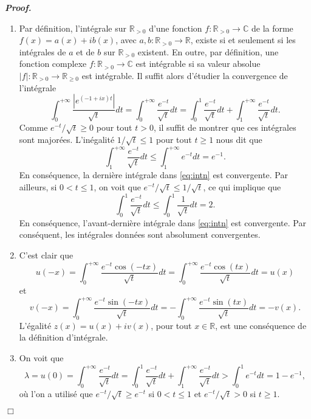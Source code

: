 \documentclass[11pt,a4paper]{article}
\newcommand{\RR}{\mathbb{R}}
\newenvironment{preuve}[1][]
{\vskip 2mm  \noindent\emph{\bf Proof#1. }}{$\Box$ \vskip 2mm}
\let\geq\geqslant
\let\leq\leqslant
\newcommand{\C}{\mathbb{C}}
\begin{document}
	\begin{preuve}
		\begin{enumerate}
			\item Par définition, l'intégrale sur $\RR_{>0}$ d'une fonction $f : \RR_{>0} \rightarrow \C$ de la forme $f(x) = a(x) + i b(x)$, avec $a,b : \RR_{>0} \rightarrow \RR$, existe si et seulement si les intégrales de $a$ et de $b$ sur $\RR_{>0}$ existent. 
			En outre, par définition, une fonction complexe $f : \RR_{>0} \rightarrow \C$ est intégrable si sa valeur absolue 
			$|f| : \RR_{>0} \rightarrow \RR_{\geq 0}$ est intégrable. 
			Il suffit alors d'étudier la convergence de l'intégrale 
			\begin{equation}
			\label{eq:intn}
			\int_0^{+\infty} \frac{|e^{(-1+ix)t}|}{\sqrt{t}} dt = \int_0^{+\infty} \frac{e^{-t}}{\sqrt{t}} dt = \int_0^{1} \frac{e^{-t}}{\sqrt{t}} dt + \int_1^{+\infty} \frac{e^{-t}}{\sqrt{t}} dt.
			\end{equation}
			Comme $e^{-t}/\sqrt{t} \geq 0$ pour tout $t >0$, il suffit de montrer que ces intégrales sont majorées. 
			L'inégalité $1/\sqrt{t} \leq 1$ pour tout $t \geq 1$ nous dit que 
			\[     \int_1^{+\infty} \frac{e^{-t}}{\sqrt{t}} dt \leq \int_1^{+\infty} e^{-t} dt = e^{-1}.     \]
			En conséquence, la dernière intégrale dans \eqref{eq:intn} est convergente. 
			Par ailleurs, si $0< t \leq 1$, on voit que $e^{-t}/\sqrt{t} \leq 1/\sqrt{t}$, ce qui implique que 
			\[     \int_0^{1} \frac{e^{-t}}{\sqrt{t}} dt \leq \int_0^{1} \frac{1}{\sqrt{t}} dt = 2.     \]
			En conséquence, l'avant-dernière intégrale dans \eqref{eq:intn} est convergente. 
			Par conséquent, les intégrales données sont absolument convergentes.  
			
			\item C'est clair que 
			\[     u(-x) = \int_0^{+\infty }\frac{e^{-t}\cos (-tx)}{\sqrt{t}}dt = \int_0^{+\infty }\frac{e^{-t}\cos (tx)}{\sqrt{t}}dt = u(x)     \]
			et 
			\[     v(-x) = \int_0^{+\infty }\frac{e^{-t}\sin(-tx)}{\sqrt{t}}dt = -\int_0^{+\infty }\frac{e^{-t}\sin (tx)}{\sqrt{t}}dt = - v(x).     \]
			L'égalité $z(x)=u(x)+iv(x)$, pour tout $x \in \RR$, est une conséquence de la définition d'intégrale. 
			
			\item On voit que
			\[     \lambda = u(0) = \int_0^{+\infty} \frac{e^{-t}}{\sqrt{t}}dt = \int_0^{1} \frac{e^{-t}}{\sqrt{t}}dt + \int_{1}^{+\infty} \frac{e^{-t}}{\sqrt{t}}dt
			> \int_0^{1} e^{-t} dt = 1 - e^{-1},     \]
			où l'on a utilisé que $e^{-t}/\sqrt{t} \geq e^{-t}$ si $0 < t \leq 1$ et $e^{-t}/\sqrt{t} > 0$ si $t \geq 1$.
			

\end{enumerate}
\end{preuve}
\end{document}
